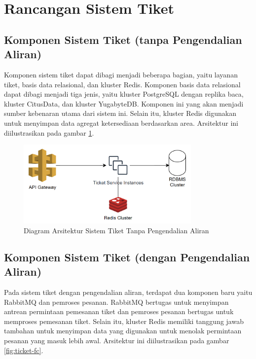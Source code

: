 \section{Rancangan Sistem Tiket}

\subsection{Komponen Sistem Tiket (tanpa Pengendalian Aliran)}

Komponen sistem tiket dapat dibagi menjadi beberapa bagian, yaitu layanan tiket, basis data relasional, dan kluster Redis. Komponen basis data relasional dapat dibagi menjadi tiga jenis, yaitu kluster PostgreSQL dengan replika baca, kluster CitusData, dan kluster YugabyteDB. Komponen ini yang akan menjadi sumber kebenaran utama dari sistem ini. Selain itu, kluster Redis digunakan untuk menyimpan data agregat ketersediaan berdasarkan area. Arsitektur ini diilustrasikan pada gambar \ref{fig:ticket-nofc}.

\begin{figure}[htbp]
    \centering
    \includegraphics[width=0.8\textwidth]{resources/chapter-3/ticket-nofc.png}
    \caption{Diagram Arsitektur Sistem Tiket Tanpa Pengendalian Aliran}
    \label{fig:ticket-nofc}
\end{figure}

\pagebreak

\subsection{Komponen Sistem Tiket (dengan Pengendalian Aliran)}

Pada sistem tiket dengan pengendalian aliran, terdapat dua komponen baru yaitu RabbitMQ dan pemroses pesanan. RabbitMQ bertugas untuk menyimpan antrean permintaan pemesanan tiket dan pemroses pesanan bertugas untuk memproses pemesanan tiket. Selain itu, kluster Redis memiliki tanggung jawab tambahan untuk menyimpan data yang digunakan untuk menolak permintaan pesanan yang masuk lebih awal. Arsitektur ini diilustrasikan pada gambar \ref{fig:ticket-fc}.

